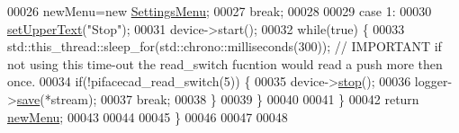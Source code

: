 \begin{DoxyCode}
00026         newMenu=\textcolor{keyword}{new} \hyperlink{classSettingsMenu}{SettingsMenu};
00027         \textcolor{keywordflow}{break};
00028 
00029     \textcolor{keywordflow}{case} 1:
00030         \hyperlink{classAbstractMenu_a4163c42d2127430e184612cb95211cda}{setUpperText}(\textcolor{stringliteral}{"Stop"});
00031         device->start();
00032         \textcolor{keywordflow}{while}(\textcolor{keyword}{true}) \{
00033             std::this\_thread::sleep\_for(std::chrono::milliseconds(300));  \textcolor{comment}{// IMPORTANT if not using this
       time-out the read\_switch fucntion would read a push more then once.}
00034             \textcolor{keywordflow}{if}(!pifacecad\_read\_switch(5)) \{
00035                 device->\hyperlink{classDeviceManager_a8569742b2eb08d95052506e372b6bd31}{stop}();
00036                 logger->\hyperlink{classDataLogger_a17296a2d3088e979c9b1f48e68caf9ad}{save}(*stream);
00037                 \textcolor{keywordflow}{break};
00038             \}
00039         \}
00040 
00041     \}
00042     \textcolor{keywordflow}{return} \hyperlink{classEcgCaptureMenu_a610d2985e09cd56cb381e6e443dbbc72}{newMenu};
00043 
00044 
00045 \}
00046 
00047 
00048 
\end{DoxyCode}
